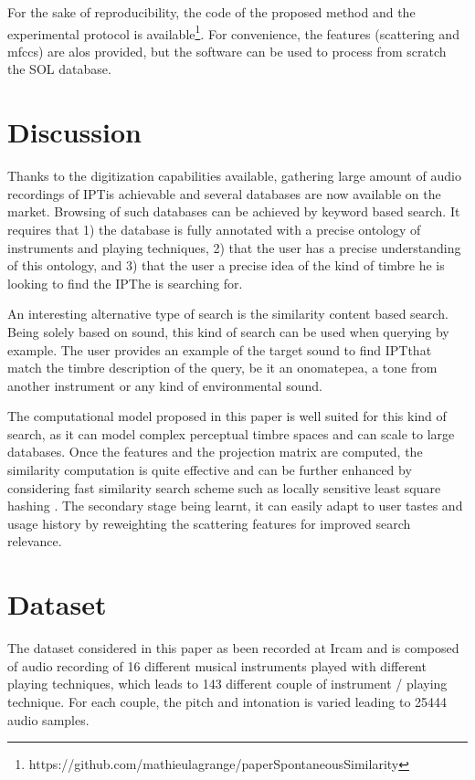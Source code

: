 \documentclass{article}
\newcommand{\ipt}{IPT}
\begin{document}
For the sake of reproducibility, the code of the proposed method and the experimental protocol is available\footnote{https://github.com/mathieulagrange/paperSpontaneousSimilarity}. For convenience, the features (scattering and mfccs) are alos provided, but the software can be used to process from scratch the SOL database.

\section{Discussion}\label{sec:discussion}

Thanks to the digitization capabilities available, gathering large amount of audio recordings of \ipt is achievable and several databases are now available on the market. Browsing of such databases can be achieved by keyword based search. It requires that 1) the database is fully annotated with a precise ontology of instruments and playing techniques, 2) that the user has a precise understanding of this ontology, and 3) that the user a precise idea of the kind of timbre he is looking to find the \ipt he is searching for.

An interesting alternative type of search is the similarity content based search. Being solely based on sound, this kind of search can be used when querying by example. The user provides an example of the target sound to find \ipt that match the timbre description of the query, be it an onomatepea, a tone from another instrument or any kind of environmental sound.

The computational model proposed in this paper is well suited for this kind of search, as it can model complex perceptual timbre spaces and can scale to large databases. Once the features and the projection matrix are computed, the similarity computation is quite effective and can be further enhanced by considering fast similarity search scheme such as locally sensitive least square hashing \cite{lsh}. The secondary stage being learnt, it can easily adapt to user tastes and usage history by reweighting the scattering features for improved search relevance.



\section{Dataset} \label{sec:dataset}

The dataset considered in this paper as been recorded at Ircam and is composed of audio recording of 16 different musical instruments played with different playing techniques, which leads to 143 different couple of instrument / playing technique. For each couple, the pitch and intonation is varied leading to 25444 audio samples.
\end{document}
